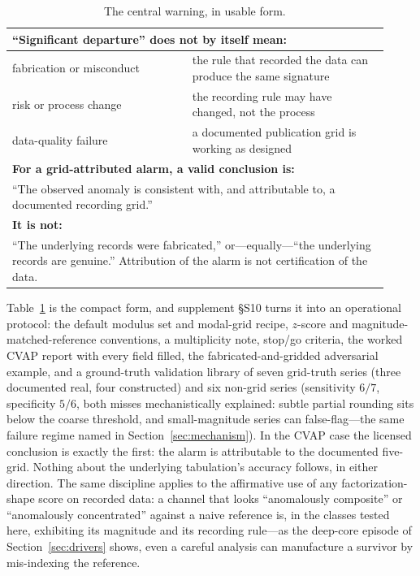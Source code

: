\documentclass[12pt]{article}
\begin{document}
\begin{table}[t]
\centering
\caption{The central warning, in usable form.}
\label{tab:warning}
\small
\begin{tabular}{p{0.44\linewidth}p{0.48\linewidth}}
\toprule
\multicolumn{2}{l}{\textbf{``Significant departure'' does not by itself mean:}} \\
\midrule
fabrication or misconduct & the rule that recorded the data can produce the same signature \\
risk or process change & the recording rule may have changed, not the process \\
data-quality failure & a documented publication grid is working as designed \\
\midrule
\multicolumn{2}{l}{\textbf{For a grid-attributed alarm, a valid conclusion is:}} \\
\midrule
\multicolumn{2}{p{0.94\linewidth}}{``The observed anomaly is consistent with,
and attributable to, a documented recording grid.''} \\
\midrule
\multicolumn{2}{l}{\textbf{It is not:}} \\
\midrule
\multicolumn{2}{p{0.94\linewidth}}{``The underlying records were
fabricated,'' or---equally---``the underlying records are genuine.''
Attribution of the alarm is not certification of the data.} \\
\bottomrule
\end{tabular}
\end{table}

Table~\ref{tab:warning} is the compact form, and supplement \S S10 turns it
into an operational protocol: the default modulus set and modal-grid recipe,
$z$-score and magnitude-matched-reference conventions, a multiplicity note,
stop/go criteria, the worked CVAP report with every field filled, the
fabricated-and-gridded adversarial example, and a ground-truth validation
library of seven grid-truth series (three documented real, four constructed)
and six non-grid series (sensitivity $6/7$, specificity $5/6$, both misses
mechanistically
explained: subtle partial rounding sits below the coarse threshold, and
small-magnitude series can false-flag---the same failure regime named in
Section~\ref{sec:mechanism}). In the CVAP case the licensed
conclusion is exactly the first: the alarm is attributable to the documented
five-grid. Nothing about the underlying tabulation's accuracy follows, in
either direction. The same discipline applies to the affirmative use of any
factorization-shape score on recorded data: a channel that looks
``anomalously composite'' or ``anomalously concentrated'' against a naive
reference is, in the classes tested here, exhibiting its magnitude and its
recording rule---as the deep-core episode of Section~\ref{sec:drivers} shows,
even a careful analysis can manufacture a survivor by mis-indexing the
reference.
\end{document}
